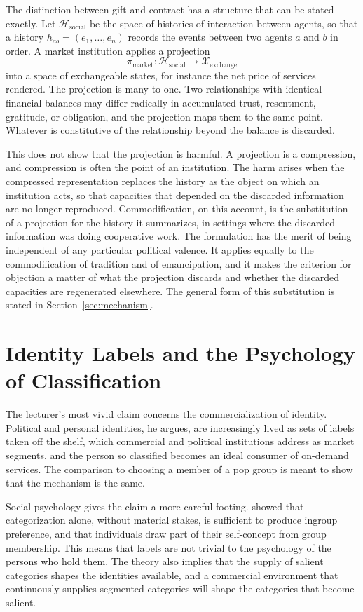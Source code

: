 \documentclass[12pt]{article}
\begin{document}
The distinction between gift and contract has a structure that can be stated exactly. Let $\mathcal H_{\mathrm{social}}$ be the space of histories of interaction between agents, so that a history $h_{ab}=(e_1,\dots,e_n)$ records the events between two agents $a$ and $b$ in order. A market institution applies a projection
\[
\pi_{\mathrm{market}}:\mathcal H_{\mathrm{social}}\longrightarrow \mathcal X_{\mathrm{exchange}}
\]
into a space of exchangeable states, for instance the net price of services rendered. The projection is many-to-one. Two relationships with identical financial balances may differ radically in accumulated trust, resentment, gratitude, or obligation, and the projection maps them to the same point. Whatever is constitutive of the relationship beyond the balance is discarded.

This does not show that the projection is harmful. A projection is a compression, and compression is often the point of an institution. The harm arises when the compressed representation replaces the history as the object on which an institution acts, so that capacities that depended on the discarded information are no longer reproduced. Commodification, on this account, is the substitution of a projection for the history it summarizes, in settings where the discarded information was doing cooperative work. The formulation has the merit of being independent of any particular political valence. It applies equally to the commodification of tradition and of emancipation, and it makes the criterion for objection a matter of what the projection discards and whether the discarded capacities are regenerated elsewhere. The general form of this substitution is stated in Section~\ref{sec:mechanism}.

\section{Identity Labels and the Psychology of Classification}
\label{sec:labels}

The lecturer's most vivid claim concerns the commercialization of identity. Political and personal identities, he argues, are increasingly lived as sets of labels taken off the shelf, which commercial and political institutions address as market segments, and the person so classified becomes an ideal consumer of on-demand services. The comparison to choosing a member of a pop group is meant to show that the mechanism is the same.

Social psychology gives the claim a more careful footing. \citet{tajfel} showed that categorization alone, without material stakes, is sufficient to produce ingroup preference, and that individuals draw part of their self-concept from group membership. This means that labels are not trivial to the psychology of the persons who hold them. The theory also implies that the supply of salient categories shapes the identities available, and a commercial environment that continuously supplies segmented categories will shape the categories that become salient.
\end{document}
